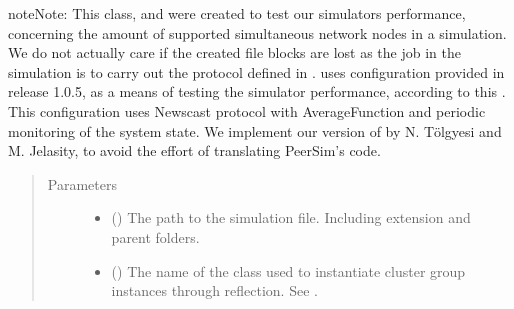 \documentclass[letterpaper,10pt,english]{sphinxmanual}
\begin{document}
\begin{fulllineitems}
\begin{fulllineitems}
\begin{sphinxadmonition}{note}{Note:}
This class, {\hyperref[\detokenize{app.domain:app.domain.cluster_groups.NewscastCluster}]{}}
and {\hyperref[\detokenize{app.domain:app.domain.network_nodes.NewscastNode}]{}} were
created to test our simulators performance, concerning the amount
of supported simultaneous network nodes in a simulation. We do
not actually care if the created file blocks are lost as the
{\hyperref[\detokenize{app.domain:app.domain.network_nodes.NewscastNode}]{}}
job in the simulation is to carry out the
protocol defined in .  uses configuration 
provided in release 1.0.5, as a means of testing the simulator
performance, according to this .
This configuration uses Newscast protocol with AverageFunction
and periodic monitoring of the system state. We implement our
version of  by
N. Tölgyesi and M. Jelasity, to avoid the effort of translating
PeerSim’s code.
\end{sphinxadmonition}
\begin{quote}\begin{description}
\item[{Parameters}] \leavevmode\begin{itemize}
\item {} 
 () \textendash{} The path to the simulation file. Including extension and
parent folders.

\item {} 
 () \textendash{} The name of the class used to instantiate cluster group
instances through reflection.
See {\hyperref[\detokenize{app.domain:module-app.domain.cluster_groups}]{}}.


\end{itemize}
\end{description}
\end{quote}
\end{fulllineitems}
\end{fulllineitems}
\end{document}
